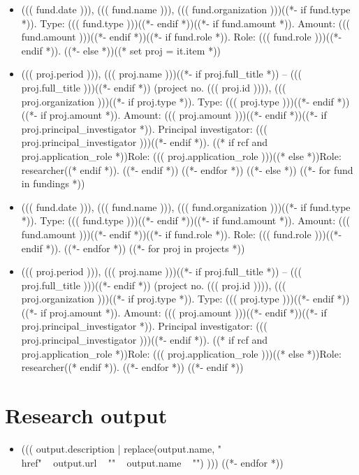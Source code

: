 \documentclass[a4paper,12pt]{article}
\begin{document}
\begin{itemize}
((*- if rcf *))
((*- for it in rcf_funding *))
((*- if it.kind == 'fund' *))((* set fund = it.item *))
\item ((( fund.date ))), ((( fund.name ))), ((( fund.organization )))((*- if fund.type *)). Type: ((( fund.type )))((*- endif *))((*- if fund.amount *)). Amount: ((( fund.amount )))((*- endif *))((*- if fund.role *)). Role: ((( fund.role )))((*- endif *)).
((*- else *))((* set proj = it.item *))
\item ((( proj.period ))), ((( proj.name )))((*- if proj.full_title *)) -- ((( proj.full_title )))((*- endif *)) (project no. ((( proj.id )))), ((( proj.organization )))((*- if proj.type *)). Type: ((( proj.type )))((*- endif *))((*- if proj.amount *)). Amount: ((( proj.amount )))((*- endif *))((*- if proj.principal_investigator *)). Principal investigator: ((( proj.principal_investigator )))((*- endif *)). ((* if rcf and proj.application_role *))Role: ((( proj.application_role )))((* else *))Role: researcher((* endif *)).
((*- endif *))
((*- endfor *))
((*- else *))
((*- for fund in fundings *))
\item ((( fund.date ))), ((( fund.name ))), ((( fund.organization )))((*- if fund.type *)). Type: ((( fund.type )))((*- endif *))((*- if fund.amount *)). Amount: ((( fund.amount )))((*- endif *))((*- if fund.role *)). Role: ((( fund.role )))((*- endif *)).
((*- endfor *))
((*- for proj in projects *))
\item ((( proj.period ))), ((( proj.name )))((*- if proj.full_title *)) -- ((( proj.full_title )))((*- endif *)) (project no. ((( proj.id )))), ((( proj.organization )))((*- if proj.type *)). Type: ((( proj.type )))((*- endif *))((*- if proj.amount *)). Amount: ((( proj.amount )))((*- endif *))((*- if proj.principal_investigator *)). Principal investigator: ((( proj.principal_investigator )))((*- endif *)). ((* if rcf and proj.application_role *))Role: ((( proj.application_role )))((* else *))Role: researcher((* endif *)).
((*- endfor *))
((*- endif *))
\end{itemize}

\section*{Research output}

\begin{itemize}
((*- for output in outputs *))
\item ((( output.description | replace(output.name, "\\href{" ~ output.url ~ "}{" ~ output.name ~ "}") )))
((*- endfor *))
\end{itemize}
\end{document}
